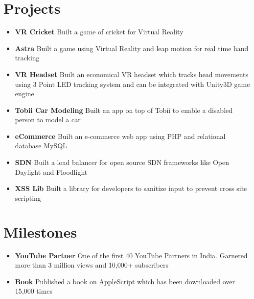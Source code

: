 \documentclass[a4paper,12pt]{article} %
\newcommand\zeroSpacing{0em}
\newcommand\sectionSpacing{0.5em}
\newcommand{\generalListStart}{\vspace{-0.5em}\begin{itemize}[leftmargin=2em]\setlength\itemsep{-0.4em}}
\newcommand{\generalListEnd}{\end{itemize}\vspace{\zeroSpacing}}
\newcommand{\oneKeyValuePairElement}[2]{
	\item \textbf{#1}{ #2}
}
\begin{document}
\vspace{\sectionSpacing}\section*{Projects}
\generalListStart
	\oneKeyValuePairElement{VR Cricket}{Built a game of cricket for Virtual Reality}
	\oneKeyValuePairElement{Astra}{Built a game using Virtual Reality and leap motion for real time hand tracking}
	\oneKeyValuePairElement{VR Headset}{Built an economical VR headset which tracks head movements using 3 Point LED tracking system and can be integrated with Unity3D game engine}
	\oneKeyValuePairElement{Tobii Car Modeling}{Built an app on top of Tobii to enable a disabled person to model a car}
	\oneKeyValuePairElement{eCommerce}{Built an e-commerce web app using PHP and relational database MySQL}
	\oneKeyValuePairElement{SDN}{Built a load balancer for open source SDN frameworks like Open Daylight and Floodlight}
	\oneKeyValuePairElement{XSS Lib}{Built a library for developers to sanitize input to prevent cross site scripting}\vspace{-1em}
\generalListEnd


\vspace{\sectionSpacing}\section*{Milestones}

\generalListStart
	\oneKeyValuePairElement{YouTube Partner}{One of the first 40 YouTube Partners in India. Garnered more than 3 million views and 10,000+ subscribers}
	\oneKeyValuePairElement{Book}{Published a book on AppleScript which has been downloaded over 15,000 times}
\generalListEnd
\end{document}
